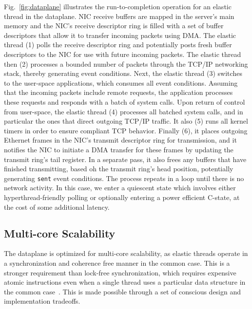 % 

Fig.~\ref{fig:dataplane} illustrates the run-to-completion operation
for an elastic thread in the \ix dataplane. NIC receive buffers are
mapped in the server's main memory and the NIC's receive descriptor
ring is filled with a set of buffer descriptors that allow it to
transfer incoming packets using DMA\@.  The elastic thread (1) polls
the receive descriptor ring and potentially posts fresh buffer
descriptors to the NIC for use with future incoming packets. The
elastic thread then (2) processes a bounded number of packets through
the TCP/IP networking stack, thereby generating event
conditions. Next, the elastic thread (3) switches to the user-space
applications, which consumes all event conditions. Assuming that the
incoming packets include remote requests, the application processes
these requests and responds with a batch of system calls. Upon return
of control from user-space, the elastic thread (4) processes all batched
system calls, and in particular the ones that direct outgoing TCP/IP
traffic. It also (5) runs all kernel timers in order to ensure
compliant TCP behavior. Finally (6), it places outgoing Ethernet
frames in the NIC's transmit descriptor ring for transmission, and it
notifies the NIC to initiate a DMA transfer for these frames by
updating the transmit ring's tail register. In a separate pass, it
also frees any buffers that have finished transmitting, based oh the
transmit ring's head position, potentially generating \texttt{sent}
event conditions.  The process repeats in a loop until there is no
network activity. In this case, we enter a quiescent state which
involves either hyperthread-friendly polling or optionally entering a
power efficient C-state, at the cost of some additional latency.


\subsection{Multi-core Scalability}
\label{sec:impl:cohfree}

The \ix dataplane is optimized for multi-core scalability, as elastic
threads operate in a synchronization and coherence free manner in the
common case. This is a stronger requirement than lock-free
synchronization, which requires expensive atomic instructions even
when a single thread uses a particular data structure in the common
case~\cite{DBLP:conf/sosp/DavidGT13}.  This is made possible through a
set of conscious design and implementation tradeoffs.

